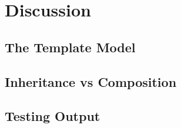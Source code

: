 \documentclass[a4paper]{scrreprt}
\begin{document}
\chapter{Discussion}
\label{sec:discussion}
\section*{The Template Model}
\section*{Inheritance vs Composition}
\section*{Testing Output}

%

\listoflistings %
\printbibliography
\end{document}

